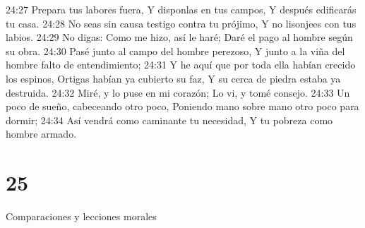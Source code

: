 24:27 Prepara tus labores fuera,  
Y disponlas en tus campos,  
Y después edificarás tu casa.  
24:28 No seas sin causa testigo contra tu prójimo,  
Y no lisonjees con tus labios.  
24:29 No digas: Como me hizo, así le haré;  
Daré el pago al hombre según su obra.  
24:30 Pasé junto al campo del hombre perezoso,  
Y junto a la viña del hombre falto de entendimiento;  
24:31 Y he aquí que por toda ella habían crecido los espinos,  
Ortigas habían ya cubierto su faz,  
Y su cerca de piedra estaba ya destruida.  
24:32 Miré, y lo puse en mi corazón;  
Lo vi, y tomé consejo.  
24:33 Un poco de sueño, cabeceando otro poco,  
Poniendo mano sobre mano otro poco para dormir;  
24:34 Así vendrá como caminante tu necesidad,  
Y tu pobreza como hombre armado. 

\chapter{25}

Comparaciones y lecciones morales  

